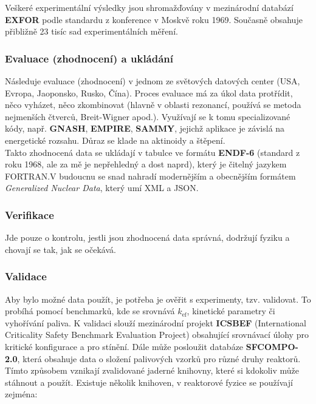 Veškeré experimentální výsledky jsou shromažďovány v mezinárodní databází \textbf{EXFOR} podle standardu z konference v Moskvě roku 1969. Současně obsahuje přibližně 23 tisíc sad experimentálních měření. 

\subsubsection{Evaluace (zhodnocení) a ukládání}

Následuje evaluace (zhodnocení) v jednom ze světových datových center (USA, Evropa, Jaoponsko, Rusko, Čína). Proces evaluace má za úkol data protřídit, něco vyházet, něco zkombinovat (hlavně v oblasti rezonancí, používá se metoda nejmenších čtverců, Breit-Wigner apod.). Využívají se k tomu specializované kódy, např. \textbf{GNASH}, \textbf{EMPIRE}, \textbf{SAMMY}, jejichž aplikace je závislá na energetické rozsahu. Důraz se klade na aktinoidy a štěpení.\\

Takto zhodnocená data se ukládají v tabulce ve formátu \textbf{ENDF-6} (standard z roku 1968, ale za mě je nepřehledný a dost naprd), který je čitelný jazykem FORTRAN.V budoucnu se snad  nahradí modernějším a obecnějším formátem \textit{Generalized Nuclear Data}, který umí XML a JSON.

\subsubsection{Verifikace}

Jde pouze o kontrolu, jestli jsou zhodnocená data správná, dodržují fyziku a chovají se tak, jak se očekává.

\subsubsection{Validace}

Aby bylo možné data použít, je potřeba je ověřit s experimenty, tzv. validovat. To probíhá pomocí benchmarků, kde se srovnává $k_\text{ef}$, kinetické parametry či vyhořívání paliva. K validaci slouží mezinárodní projekt \textbf{ICSBEF} (International Criticality Safety Benchmark Evaluation Project) obsahující srovnávací úlohy pro kritické konfigurace a pro stínění. Dále může posloužit databáze \textbf{SFCOMPO-2.0}, která obsahuje data o složení palivových vzorků pro různé druhy reaktorů.\\

Tímto způsobem vznikají zvalidované jaderné knihovny, které si kdokoliv může stáhnout a použít. Existuje několik knihoven, v reaktorové fyzice se používají zejména:

